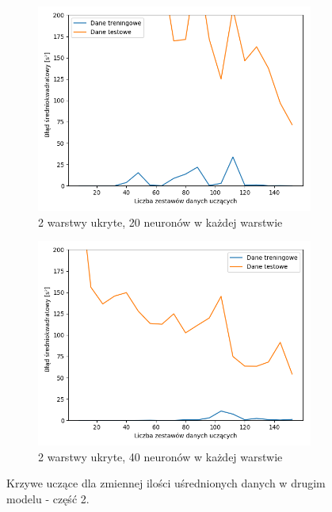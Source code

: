 \documentclass[12pt]{aghdpl}
\begin{document}
		 \begin{figure}[h]
			\centering
		 	\begin{subfigure}{.8\linewidth}
		 		\includegraphics[width =\linewidth]{wykresy/5_usrednianie_danych/2_warstwy_20_neuronow_learning_curves.png}
		 		\caption{2 warstwy ukryte, 20 neuronów w każdej warstwie}
		 	\end{subfigure}
		 	\begin{subfigure}{.8\linewidth}
		 		\includegraphics[width =\linewidth]{wykresy/5_usrednianie_danych/2_warstwy_40_neuronow_learning_curves.png}
		 		\caption{2 warstwy ukryte, 40 neuronów w każdej warstwie}
		 	\end{subfigure}
	 	
 			\caption{Krzywe uczące dla zmiennej ilości uśrednionych danych w drugim modelu - część 2.}
			\label{fig: drugi_model_przy_usrednionych_danych_learning_curves_2}
		\end{figure}
		
\end{document}
